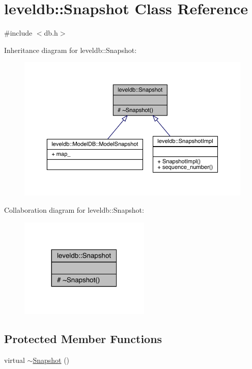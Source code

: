 \hypertarget{classleveldb_1_1_snapshot}{}\section{leveldb\+::Snapshot Class Reference}
\label{classleveldb_1_1_snapshot}


{\ttfamily \#include $<$db.\+h$>$}



Inheritance diagram for leveldb\+::Snapshot\+:
\nopagebreak
\begin{figure}[H]
\begin{center}
\leavevmode
\includegraphics[width=350pt]{classleveldb_1_1_snapshot__inherit__graph}
\end{center}
\end{figure}


Collaboration diagram for leveldb\+::Snapshot\+:
\nopagebreak
\begin{figure}[H]
\begin{center}
\leavevmode
\includegraphics[width=176pt]{classleveldb_1_1_snapshot__coll__graph}
\end{center}
\end{figure}
\subsection*{Protected Member Functions}
\begin{DoxyCompactItemize}
\item 
virtual \mbox{\hyperlink{classleveldb_1_1_snapshot_aa09531c67fc12a374f2d872ed2489e6b}{$\sim$\+Snapshot}} ()
\end{DoxyCompactItemize}


